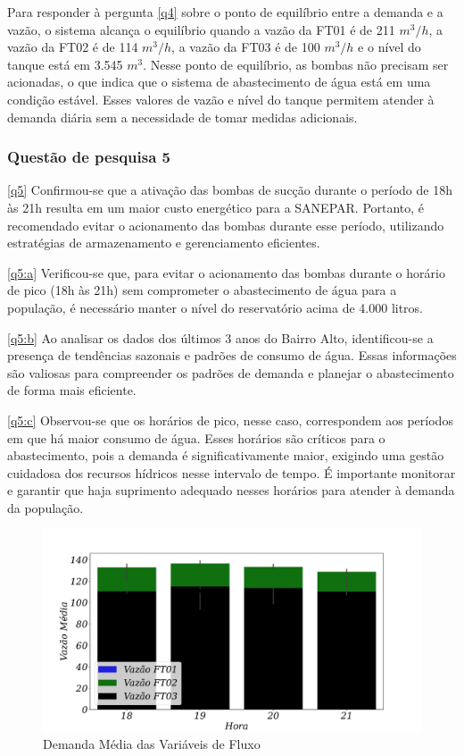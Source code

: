Para responder à pergunta \ref{q4} sobre o ponto de equilíbrio entre a demanda e a vazão, o sistema alcança o equilíbrio quando a vazão da FT01 é de 211 $m^3/h$, a vazão da FT02 é de 114 $m^3/h$, a vazão da FT03 é de 100 $m^3/h$ e o nível do tanque está em 3.545 $m^3$. Nesse ponto de equilíbrio, as bombas não precisam ser acionadas, o que indica que o sistema de abastecimento de água está em uma condição estável. Esses valores de vazão e nível do tanque permitem atender à demanda diária sem a necessidade de tomar medidas adicionais.


\subsubsection{Quest\~ao de pesquisa 5}

\ref{q5} Confirmou-se que a ativação das bombas de sucção durante o período de 18h às 21h resulta em um maior custo energético para a SANEPAR. Portanto, é recomendado evitar o acionamento das bombas durante esse período, utilizando estratégias de armazenamento e gerenciamento eficientes.

\ref{q5:a} Verificou-se que, para evitar o acionamento das bombas durante o horário de pico (18h às 21h) sem comprometer o abastecimento de água para a população, é necessário manter o nível do reservatório acima de 4.000 litros.

\ref{q5:b} Ao analisar os dados dos últimos 3 anos do Bairro Alto, identificou-se a presença de tendências sazonais e padrões de consumo de água. Essas informações são valiosas para compreender os padrões de demanda e planejar o abastecimento de forma mais eficiente.

\ref{q5:c} Observou-se que os horários de pico, nesse caso, correspondem aos períodos em que há maior consumo de água. Esses horários são críticos para o abastecimento, pois a demanda é significativamente maior, exigindo uma gestão cuidadosa dos recursos hídricos nesse intervalo de tempo. É importante monitorar e garantir que haja suprimento adequado nesses horários para atender à demanda da população.



\begin{figure}[!htb]
	\centering
	\caption{Demanda Média das Variáveis de Fluxo}
	\includegraphics[width=0.9\linewidth]{Resultados/Figuras/grafico-barras-demanda}
	
	\label{fig:grafico-barras-demanda}
	
\end{figure}

